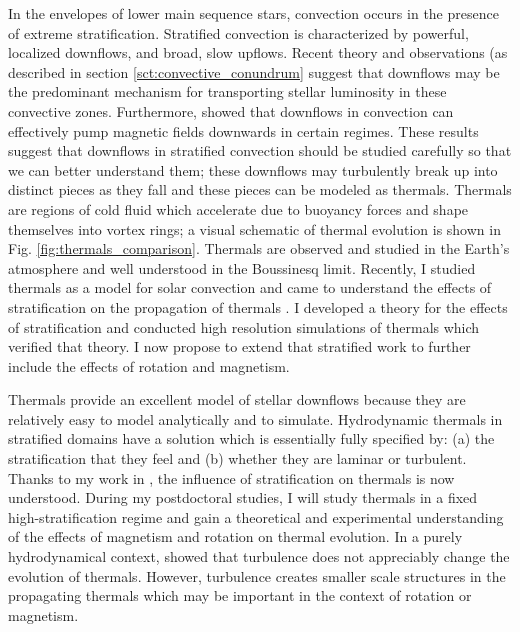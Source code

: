 \documentclass[aasms,12pt]{article}
\begin{document}
In the envelopes of lower main sequence stars, convection occurs in the presence of extreme stratification.
Stratified convection is characterized by powerful, localized downflows, and broad, slow upflows.
Recent theory and observations (as described in section \ref{sct:convective_conundrum} suggest that downflows may be the predominant mechanism for transporting stellar luminosity in these convective zones.
Furthermore, \citet{tobias&all1998} showed that downflows in convection can effectively pump magnetic fields downwards in certain regimes.
These results suggest that downflows in stratified convection should be studied carefully so that we can better understand them; these downflows may turbulently break up into distinct pieces as they fall and these pieces can be modeled as thermals.
Thermals are regions of cold fluid which accelerate due to buoyancy forces and shape themselves into vortex rings; a visual schematic of thermal evolution is shown in Fig. \ref{fig:thermals_comparison}.
Thermals are observed and studied in the Earth's atmosphere and well understood in the Boussinesq limit.
Recently, I studied thermals as a model for solar convection and came to understand the effects of stratification on the propagation of thermals \citep{andersLB2019}.
I developed a theory for the effects of stratification and conducted high resolution simulations of thermals which verified that theory.
I now propose to extend that stratified work to further include the effects of rotation and magnetism.

Thermals provide an excellent model of stellar downflows because they are relatively easy to model analytically and to simulate.
Hydrodynamic thermals in stratified domains have a solution which is essentially fully specified by: (a) the stratification that they feel and (b) whether they are laminar or turbulent.
Thanks to my work in \citet{andersLB2019}, the influence of stratification on thermals is now understood.
During my postdoctoral studies, I will study thermals in a fixed high-stratification regime and gain a theoretical and experimental understanding of the effects of magnetism and rotation on thermal evolution.
In a purely hydrodynamical context, \citet{lecoanet&jeevanjee2019} showed that turbulence does not appreciably change the evolution of thermals.
However, turbulence creates smaller scale structures in the propagating thermals which may be important in the context of rotation or magnetism.
\end{document}
